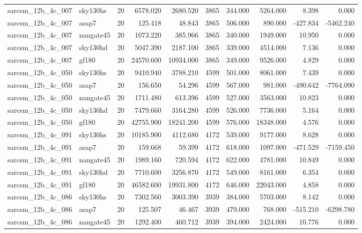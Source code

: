 \begin{longtable}{llrrrrrrrr}
sarcsm\_12b\_4c\_007 & sky130hs & 20 & 6578.020 & 2680.520 & 3865 & 344.000 & 5264.000 & 8.398 & 0.000 \\
sarcsm\_12b\_4c\_007 & asap7 & 20 & 125.418 & 48.843 & 3865 & 506.000 & 890.000 & -427.834 & -5462.240 \\
sarcsm\_12b\_4c\_007 & nangate45 & 20 & 1073.220 & 385.966 & 3865 & 340.000 & 1949.000 & 10.950 & 0.000 \\
sarcsm\_12b\_4c\_007 & sky130hd & 20 & 5047.390 & 2187.100 & 3865 & 339.000 & 4514.000 & 7.136 & 0.000 \\
sarcsm\_12b\_4c\_007 & gf180 & 20 & 24570.600 & 10934.000 & 3865 & 349.000 & 9526.000 & 4.829 & 0.000 \\
sarcsm\_12b\_4c\_050 & sky130hs & 20 & 9410.940 & 3788.210 & 4599 & 501.000 & 8061.000 & 7.439 & 0.000 \\
sarcsm\_12b\_4c\_050 & asap7 & 20 & 156.650 & 54.296 & 4599 & 567.000 & 981.000 & -490.642 & -7764.090 \\
sarcsm\_12b\_4c\_050 & nangate45 & 20 & 1711.480 & 613.396 & 4599 & 527.000 & 3563.000 & 10.823 & 0.000 \\
sarcsm\_12b\_4c\_050 & sky130hd & 20 & 7479.660 & 3164.280 & 4599 & 526.000 & 7736.000 & 5.164 & 0.000 \\
sarcsm\_12b\_4c\_050 & gf180 & 20 & 42755.900 & 18241.200 & 4599 & 576.000 & 18348.000 & 4.576 & 0.000 \\
sarcsm\_12b\_4c\_091 & sky130hs & 20 & 10185.900 & 4112.680 & 4172 & 539.000 & 9177.000 & 8.628 & 0.000 \\
sarcsm\_12b\_4c\_091 & asap7 & 20 & 159.668 & 59.399 & 4172 & 618.000 & 1097.000 & -471.529 & -7159.450 \\
sarcsm\_12b\_4c\_091 & nangate45 & 20 & 1989.160 & 720.594 & 4172 & 622.000 & 4781.000 & 10.849 & 0.000 \\
sarcsm\_12b\_4c\_091 & sky130hd & 20 & 7710.600 & 3256.870 & 4172 & 549.000 & 8161.000 & 6.354 & 0.000 \\
sarcsm\_12b\_4c\_091 & gf180 & 20 & 46582.600 & 19931.800 & 4172 & 646.000 & 22043.000 & 4.858 & 0.000 \\
sarcsm\_12b\_4c\_086 & sky130hs & 20 & 7302.560 & 3003.390 & 3939 & 384.000 & 5703.000 & 8.142 & 0.000 \\
sarcsm\_12b\_4c\_086 & asap7 & 20 & 125.507 & 46.467 & 3939 & 479.000 & 768.000 & -515.210 & -6298.780 \\
sarcsm\_12b\_4c\_086 & nangate45 & 20 & 1292.400 & 460.712 & 3939 & 394.000 & 2424.000 & 10.776 & 0.000 \\

\end{longtable}
